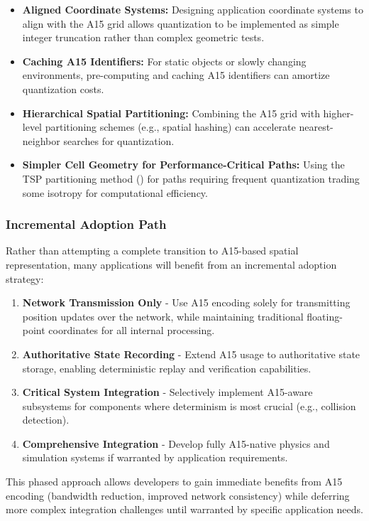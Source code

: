 \documentclass[10pt]{article}
\begin{document}
\begin{itemize}\itemsep0pt
    \item \textbf{Aligned Coordinate Systems:} Designing application coordinate systems to align with the A15 grid allows quantization to be implemented as simple integer truncation rather than complex geometric tests.
    \item \textbf{Caching A15 Identifiers:} For static objects or slowly changing environments, pre-computing and caching A15 identifiers can amortize quantization costs.
    \item \textbf{Hierarchical Spatial Partitioning:} Combining the A15 grid with higher-level partitioning schemes (e.g., spatial hashing) can accelerate nearest-neighbor searches for quantization.
    \item \textbf{Simpler Cell Geometry for Performance-Critical Paths:} Using the TSP partitioning method () for paths requiring frequent quantization trading some isotropy for computational efficiency.
\end{itemize}

\subsubsection{Incremental Adoption Path}\label{subsubsec-impl-adoption}
Rather than attempting a complete transition to A15-based spatial representation, many applications will benefit from an incremental adoption strategy:

\begin{enumerate}\itemsep0pt
    \item \textbf{Network Transmission Only} - Use A15 encoding solely for transmitting position updates over the network, while maintaining traditional floating-point coordinates for all internal processing.
    \item \textbf{Authoritative State Recording} - Extend A15 usage to authoritative state storage, enabling deterministic replay and verification capabilities.
    \item \textbf{Critical System Integration} - Selectively implement A15-aware subsystems for components where determinism is most crucial (e.g., collision detection).
    \item \textbf{Comprehensive Integration} - Develop fully A15-native physics and simulation systems if warranted by application requirements.
\end{enumerate}

This phased approach allows developers to gain immediate benefits from A15 encoding (bandwidth reduction, improved network consistency) while deferring more complex integration challenges until warranted by specific application needs.
\end{document}
